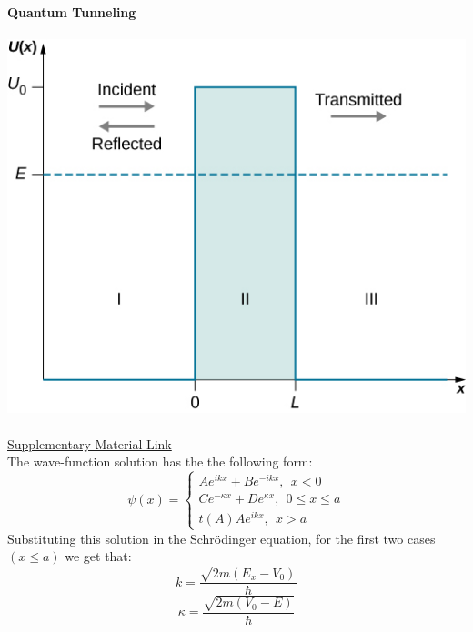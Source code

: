 \documentclass{article}
\begin{document}
\textbf{Quantum Tunneling} \\ \\
\includegraphics[]{QuantumTunneling.jpg} \\ \\ 
\href{https://spot.colorado.edu/~rehnd/heuristics/pdf/tunnelingSummary.pdf}{\color{blue}Supplementary Material Link} \\
The wave-function solution has the the following form:
$$\psi(x) = \begin{cases}
    Ae^{ikx} + B e^{-ikx}, \ \ x<0 \\
    Ce^{-\kappa x}+De^{\kappa x}, \ \ 0 \leq x \leq a \\
    t(A)Ae^{ikx}, \ \ x>a
\end{cases}
$$
Substituting this solution in the Schrödinger equation, for the first two cases$(x\leq a)$ we get that:
$$ k =  \frac{\sqrt{{2m}(E_x-V_0)}}{\hslash}$$
$$ \kappa = \frac{\sqrt{2m(V_0-E)}}{\hslash} $$
\end{document}
